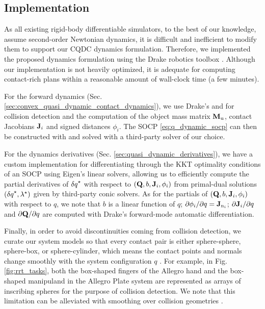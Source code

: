 \subsection{Implementation} \label{sec:quasi_static:implementation}
As all existing rigid-body differentiable simulators, to the best of our knowledge, assume second-order Newtonian dynamics, it is difficult and inefficient to modify them to support our CQDC dynamics formulation. Therefore, we implemented the proposed dynamics formulation using the Drake robotics toolbox \cite{drake}. Although our implementation is not heavily optimized, it is adequate for computing contact-rich plans within a reasonable amount of wall-clock time (a few minutes). 

For the forward dynamics (Sec. \ref{sec:convex_quasi_dynamic_contact_dynamics}), we use Drake's  and  for collision detection and the computation of the object mass matrix $\Mu$, contact Jacobians $\J_i$ and signed distances $\phi_i$. The SOCP \eqref{eq:q_dynamic_socp} can then be constructed with  and solved with a third-party solver of our choice.

For the dynamics derivatives (Sec. \ref{sec:quasi_dynamic_derivatives}), we have a custom implementation for differentiating through the KKT optimality conditions of an SOCP using Eigen's \cite{eigenweb} linear solvers, allowing us to efficiently compute the partial derivatives of $\dq^\star$ with respect to $(\mathbf{Q}, b, \J_i, \phi_i)$ from primal-dual solutions $(\dq^\star, \lambda^\star)$ given by third-party conic solvers. As for the partials of $(\mathbf{Q}, b, \J_i, \phi_i)$ with respect to $q$, we note that $b$ is a linear function of $q$;  $\DfDxLine{\phi_i}{q} = \Jn[i]$; $\DfDxLine{\J_i}{q}$ and $\DfDxLine{\mathbf{Q}}{q}$ are computed with Drake's forward-mode automatic differentiation.

Finally, in order to avoid discontinuities coming from collision detection, we curate our system models so that every contact pair is either sphere-sphere, sphere-box, or sphere-cylinder, which means the contact points and normals change smoothly with the system configuration $q$ \cite{SiggraphContact22}. For example, in Fig. \ref{fig:rrt_tasks}, both the box-shaped fingers of the Allegro hand and the box-shaped manipuland in the Allegro Plate system are represented as arrays of inscribing spheres for the purpose of collision detection.
We note that this limitation can be alleviated with smoothing over collision geometries \cite{simonsinglelevel,randomizedsmoothingcollision}. 

